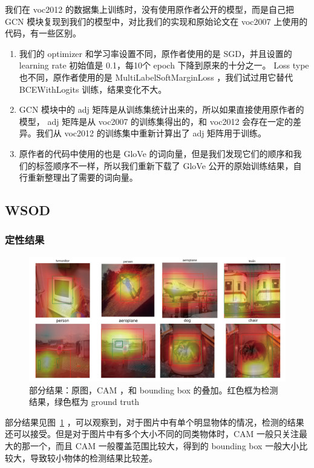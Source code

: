 \documentclass[a4paper]{ctexart}
\begin{document}
我们在 voc2012 的数据集上训练时，没有使用原作者公开的模型，而是自己把 GCN 模块复现到我们的模型中，对比我们的实现和原始论文在 voc2007 上使用的代码，有一些区别。
\begin{enumerate}
    \item 我们的 optimizer 和学习率设置不同，原作者使用的是 SGD，并且设置的 learning rate 初始值是 0.1，每10个 epoch 下降到原来的十分之一。 Loss type 也不同，原作者使用的是 MultiLabelSoftMarginLoss ，我们试过用它替代 BCEWithLogits 训练，结果变化不大。
    \item GCN 模块中的 adj 矩阵是从训练集统计出来的，所以如果直接使用原作者的模型， adj 矩阵是从 voc2007 的训练集得出的，和 voc2012 会存在一定的差异。我们从 voc2012 的训练集中重新计算出了 adj 矩阵用于训练。
    \item 原作者的代码中使用的也是 GloVe 的词向量，但是我们发现它们的顺序和我们的标签顺序不一样，所以我们重新下载了 GloVe 公开的原始训练结果，自行重新整理出了需要的词向量。
\end{enumerate}

\subsection{WSOD}
\subsubsection{定性结果}

\begin{figure}[t]
    \centering
    \includegraphics[width=\linewidth]{img/qualitativeLR.pdf}
    \caption{部分结果：原图，CAM ，和 bounding box 的叠加。红色框为检测结果，绿色框为 ground truth}
    \label{fig:qualitative}
\end{figure}

部分结果见图~\ref{fig:qualitative} ，可以观察到，对于图片中有单个明显物体的情况，检测的结果还可以接受。但是对于图片中有多个大小不同的同类物体时，CAM 一般只关注最大的那一个，而且 CAM 一般覆盖范围比较大，得到的 bounding box 一般大小比较大，导致较小物体的检测结果比较差。
\end{document}
